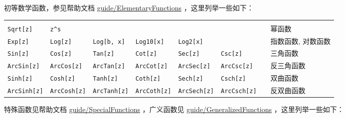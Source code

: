 \documentclass[UTF8,a4paper,10pt]{ctexart}
\begin{document}
初等数学函数，参见帮助文档
\href{http://reference.wolfram.com/language/guide/ElementaryFunctions.html}{guide/ElementaryFunctions}
，这里列举一些如下：
\par
\tabcolsep=2pt
\begin{center}
\begin{tabular}{lllllll|l}
\hline\hline\hline
& & & & & & & \\[-12pt]
\verb+Sqrt[z]+    & \verb+z^s+        &                   &
                  &                   &                   & \qquad & {\;}幂函数 \\
\verb+Exp[z]+     & \verb+Log[z]+     & \verb+Log[b, x]+  &
\verb+Log10[x]+   & \verb+Log2[x]+    &                   & \qquad & {\;}指数函数, 对数函数   \\
\verb+Sin[z]+     & \verb+Cos[z]+     & \verb+Tan[z]+     &
\verb+Cot[z]+     & \verb+Sec[z]+     & \verb+Csc[z]+     & \qquad & {\;}三角函数   \\
\verb+ArcSin[z]+  & \verb+ArcCos[z]+  & \verb+ArcTan[z]+  &
\verb+ArcCot[z]+  & \verb+ArcSec[z]+  & \verb+ArcCsc[z]+  & \qquad & {\;}反三角函数 \\
\verb+Sinh[z]+    & \verb+Cosh[z]+    & \verb+Tanh[z]+    &
\verb+Coth[z]+    & \verb+Sech[z]+    & \verb+Csch[z]+    & \qquad & {\;}双曲函数           \\
\verb+ArcSinh[z]+ & \verb+ArcCosh[z]+ & \verb+ArcTanh[z]+ &
\verb+ArcCoth[z]+ & \verb+ArcSech[z]+ & \verb+ArcCsch[z]+ & \qquad & {\;}反双曲函数 \\
\hline\hline\hline
\end{tabular}
\end{center}


特殊函数见帮助文档
\href{http://reference.wolfram.com/language/guide/SpecialFunctions.html}{guide/SpecialFunctions}
，广义函数见
\href{http://reference.wolfram.com/language/guide/GeneralizedFunctions.html}{guide/GeneralizedFunctions}
，这里列举一些如下：
\end{document}
